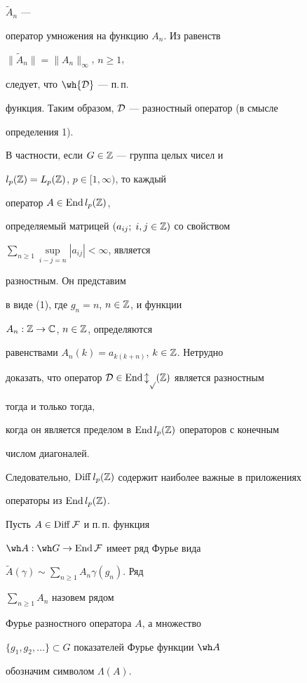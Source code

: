 $\widetilde A_n$ --- 


оператор умножения на функцию $A_n$. Из равенств 


$\|\widetilde A_n\|=\|A_n\|_\infty$, $n\ge 1$, 


следует, что $\wh{\cal D}$ --- п.\,п. 


функция. Таким образом, $\cal D$ --- разностный оператор (в смысле 


определения 1). 


 


В частности, если $G\in\Bbb Z$ --- группа целых чисел и 


$l_p(\Bbb Z)=L_p(\Bbb Z)$, $p\in[1,\infty)$, то каждый 


оператор $A\in\operatorname{End} l_p(\Bbb Z)$, 


определяемый матрицей $(a_{ij};\;i,j\in\Bbb Z)$ со свойством 


$\sum\limits_{n\ge 1}\sup\limits_{i-j=n}|a_{ij}|<\infty$, является 


разностным. Он представим 


в виде (1), где $g_n=n$, $n\in\Bbb Z$, и функции 


$A_n:\Bbb Z\to\Bbb C$, $n\in\Bbb Z$, определяются 


равенствами $A_n(k)=a_{k(k+n)}$, $k\in\Bbb Z$. Нетрудно 


доказать, что оператор $\cal D\in\operatorname{End} l_p(\Bbb Z)$ является разностным 


тогда и только тогда, 


когда он является пределом в $\operatorname{End} l_p(\Bbb Z)$ операторов с конечным 


числом диагоналей. 


Следовательно, $\operatorname{Diff} l_p(\Bbb Z)$ содержит наиболее важные в приложениях 


операторы из $\operatorname{End} l_p(\Bbb Z)$. 


 


\begin{defn} Пусть $A\in\operatorname{Diff}\cal F$ и п.\,п. функция 


$\wh A:\wh G\to\End\cal F$ имеет ряд Фурье вида 


$\widetilde A(\gamma)\sim\sum\limits_{n\ge 1}A_n\gamma(g_n)$. Ряд 


$\sum\limits_{n\ge 1}A_n$ назовем рядом 


Фурье разностного оператора $A$, а множество 


$\{g_1,g_2,\dotsc\}\subset G$ показателей Фурье функции $\wh A$ 


обозначим символом $\Lambda(A)$. 


\end{defn} 


